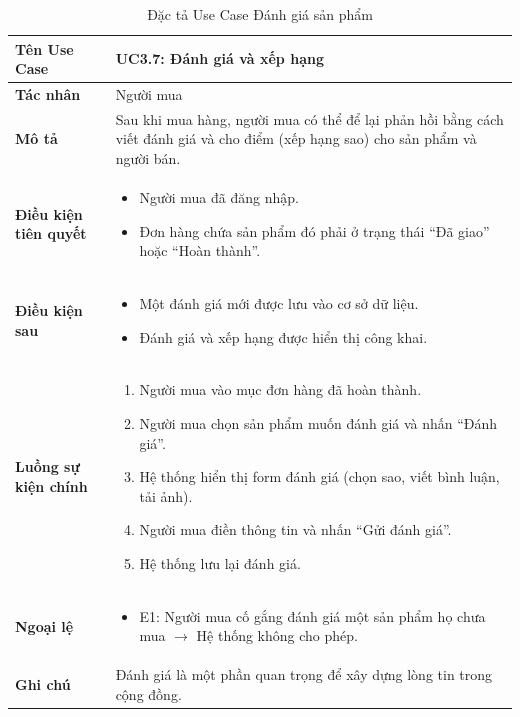 \begin{table}[H]
\centering
\begin{tabularx}{\textwidth}{|l|X|}
\hline
\textbf{Tên Use Case} & \textbf{UC3.7: Đánh giá và xếp hạng} \\ \hline
\textbf{Tác nhân} & Người mua \\ \hline
\textbf{Mô tả} & Sau khi mua hàng, người mua có thể để lại phản hồi bằng cách viết đánh giá và cho điểm (xếp hạng sao) cho sản phẩm và người bán. \\ \hline
\textbf{Điều kiện tiên quyết} & 
\begin{itemize}
    \item Người mua đã đăng nhập.
    \item Đơn hàng chứa sản phẩm đó phải ở trạng thái ``Đã giao'' hoặc ``Hoàn thành''.
\end{itemize} \\ \hline
\textbf{Điều kiện sau} & 
\begin{itemize}
    \item Một đánh giá mới được lưu vào cơ sở dữ liệu.
    \item Đánh giá và xếp hạng được hiển thị công khai.
\end{itemize} \\ \hline
\textbf{Luồng sự kiện chính} & 
\begin{enumerate}
    \item Người mua vào mục đơn hàng đã hoàn thành.
    \item Người mua chọn sản phẩm muốn đánh giá và nhấn ``Đánh giá''.
    \item Hệ thống hiển thị form đánh giá (chọn sao, viết bình luận, tải ảnh).
    \item Người mua điền thông tin và nhấn ``Gửi đánh giá''.
    \item Hệ thống lưu lại đánh giá.
\end{enumerate} \\ \hline
\textbf{Ngoại lệ} & 
\begin{itemize}
    \item E1: Người mua cố gắng đánh giá một sản phẩm họ chưa mua $\rightarrow$ Hệ thống không cho phép.
\end{itemize} \\ \hline
\textbf{Ghi chú} & Đánh giá là một phần quan trọng để xây dựng lòng tin trong cộng đồng. \\ \hline
\end{tabularx}
\caption{Đặc tả Use Case Đánh giá sản phẩm}
\end{table}

